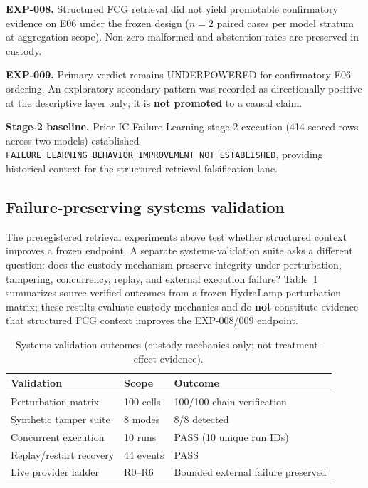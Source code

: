 \documentclass{article}
\begin{document}
\textbf{EXP-008.} Structured FCG retrieval did not yield promotable confirmatory evidence on E06 under the frozen design ($n=2$ paired cases per model stratum at aggregation scope). Non-zero malformed and abstention rates are preserved in custody.

\textbf{EXP-009.} Primary verdict remains UNDERPOWERED for confirmatory E06 ordering. An exploratory secondary pattern was recorded as directionally positive at the descriptive layer only; it is \textbf{not promoted} to a causal claim.

\textbf{Stage-2 baseline.} Prior IC Failure Learning stage-2 execution (414 scored rows across two models) established \texttt{FAILURE\_LEARNING\_BEHAVIOR\_IMPROVEMENT\_NOT\_ESTABLISHED}, providing historical context for the structured-retrieval falsification lane.

\subsection{Failure-preserving systems validation}

The preregistered retrieval experiments above test whether structured context improves a frozen endpoint.
A separate systems-validation suite asks a different question: does the custody mechanism preserve integrity under perturbation, tampering, concurrency, replay, and external execution failure?
Table~\ref{tab:systems} summarizes source-verified outcomes from a frozen HydraLamp perturbation matrix; these results evaluate custody mechanics and do \textbf{not} constitute evidence that structured FCG context improves the EXP-008/009 endpoint.

\begin{table}[t]
  \centering
  \caption{Systems-validation outcomes (custody mechanics only; not treatment-effect evidence).}
  \label{tab:systems}
  \begin{tabular}{lll}
    \toprule
    Validation & Scope & Outcome \\
    \midrule
    Perturbation matrix & 100 cells & 100/100 chain verification \\
    Synthetic tamper suite & 8 modes & 8/8 detected \\
    Concurrent execution & 10 runs & PASS (10 unique run IDs) \\
    Replay/restart recovery & 44 events & PASS \\
    Live provider ladder & R0--R6 & Bounded external failure preserved \\
    \bottomrule
  \end{tabular}
\end{table}
\end{document}
